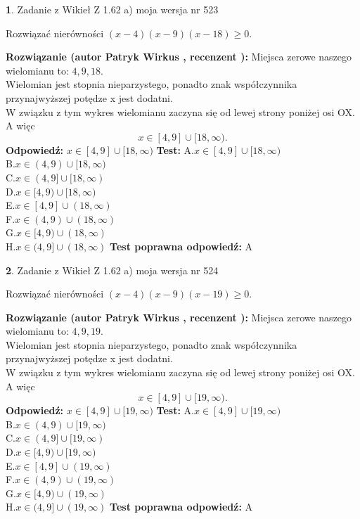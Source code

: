 \documentclass[12pt, a4paper]{article}
\theoremstyle{definition} %
\newtheorem{zad}{}
\newcommand{\zadStart}[1]{\begin{zad}#1\newline}
\newcommand{\zadStop}{\end{zad}}
\newcommand{\rozwStart}[2]{\noindent \textbf{Rozwiązanie (autor #1 , recenzent #2): }\newline}
\newcommand{\rozwStop}{\newline}
\newcommand{\odpStart}{\noindent \textbf{Odpowiedź:}\newline}
\newcommand{\odpStop}{\newline}
\newcommand{\testStart}{\noindent \textbf{Test:}\newline}
\newcommand{\testStop}{\newline}
\newcommand{\kluczStart}{\noindent \textbf{Test poprawna odpowiedź:}\newline}
\newcommand{\kluczStop}{\newline}
\begin{document}
\zadStart{Zadanie z Wikieł Z 1.62 a) moja wersja nr 523}

Rozwiązać nierówności $(x-4)(x-9)(x-18)\ge0$.
\zadStop
\rozwStart{Patryk Wirkus}{}
Miejsca zerowe naszego wielomianu to: $4, 9, 18$.\\
Wielomian jest stopnia nieparzystego, ponadto znak współczynnika przy\linebreak najwyższej potędze x jest dodatni.\\ W związku z tym wykres wielomianu zaczyna się od lewej strony poniżej osi OX. A więc $$x \in [4,9] \cup [18,\infty).$$
\rozwStop
\odpStart
$x \in [4,9] \cup [18,\infty)$
\odpStop
\testStart
A.$x \in [4,9] \cup [18,\infty)$\\
B.$x \in (4,9) \cup [18,\infty)$\\
C.$x \in (4,9] \cup [18,\infty)$\\
D.$x \in [4,9) \cup [18,\infty)$\\
E.$x \in [4,9] \cup (18,\infty)$\\
F.$x \in (4,9) \cup (18,\infty)$\\
G.$x \in [4,9) \cup (18,\infty)$\\
H.$x \in (4,9] \cup (18,\infty)$
\testStop
\kluczStart
A
\kluczStop



\zadStart{Zadanie z Wikieł Z 1.62 a) moja wersja nr 524}

Rozwiązać nierówności $(x-4)(x-9)(x-19)\ge0$.
\zadStop
\rozwStart{Patryk Wirkus}{}
Miejsca zerowe naszego wielomianu to: $4, 9, 19$.\\
Wielomian jest stopnia nieparzystego, ponadto znak współczynnika przy\linebreak najwyższej potędze x jest dodatni.\\ W związku z tym wykres wielomianu zaczyna się od lewej strony poniżej osi OX. A więc $$x \in [4,9] \cup [19,\infty).$$
\rozwStop
\odpStart
$x \in [4,9] \cup [19,\infty)$
\odpStop
\testStart
A.$x \in [4,9] \cup [19,\infty)$\\
B.$x \in (4,9) \cup [19,\infty)$\\
C.$x \in (4,9] \cup [19,\infty)$\\
D.$x \in [4,9) \cup [19,\infty)$\\
E.$x \in [4,9] \cup (19,\infty)$\\
F.$x \in (4,9) \cup (19,\infty)$\\
G.$x \in [4,9) \cup (19,\infty)$\\
H.$x \in (4,9] \cup (19,\infty)$
\testStop
\kluczStart
A
\kluczStop
\end{document}
